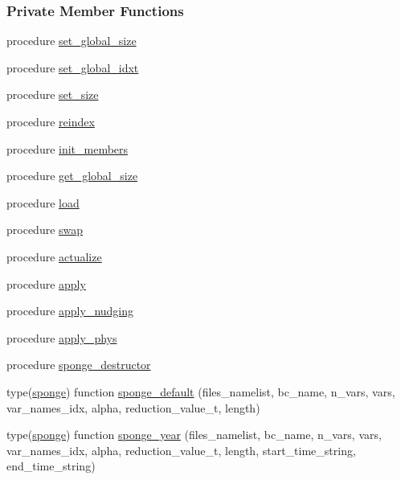 \subsubsection*{Private Member Functions}
\begin{DoxyCompactItemize}
\item 
procedure \mbox{\hyperlink{structsponge__mod_1_1sponge_afa5fb267b1d59f3b18ee94035a4816e3}{set\+\_\+global\+\_\+size}}
\item 
procedure \mbox{\hyperlink{structsponge__mod_1_1sponge_a2e1d0efffaf26aef18699231850069c5}{set\+\_\+global\+\_\+idxt}}
\item 
procedure \mbox{\hyperlink{structsponge__mod_1_1sponge_a2da2baff3ceb54811626114035885989}{set\+\_\+size}}
\item 
procedure \mbox{\hyperlink{structsponge__mod_1_1sponge_a8ea78d5f48aff24e7fd7ac5478e2bbc4}{reindex}}
\item 
procedure \mbox{\hyperlink{structsponge__mod_1_1sponge_a2b045a0f566da7df427aa0b776f92aa2}{init\+\_\+members}}
\item 
procedure \mbox{\hyperlink{structsponge__mod_1_1sponge_a6e25af9d9685756eca68b255dcbefde4}{get\+\_\+global\+\_\+size}}
\item 
procedure \mbox{\hyperlink{structsponge__mod_1_1sponge_a0383aabeecf15b7c47bc43c9b4746c60}{load}}
\item 
procedure \mbox{\hyperlink{structsponge__mod_1_1sponge_abe0102a0a72e189b8871724a21680c43}{swap}}
\item 
procedure \mbox{\hyperlink{structsponge__mod_1_1sponge_a7d01836ef5f2e2ea4ee11a6c6231baed}{actualize}}
\item 
procedure \mbox{\hyperlink{structsponge__mod_1_1sponge_aca76f3cc282e1918ec76c8d6c34d4315}{apply}}
\item 
procedure \mbox{\hyperlink{structsponge__mod_1_1sponge_a8617d126acfe553a2d478258adaf029f}{apply\+\_\+nudging}}
\item 
procedure \mbox{\hyperlink{structsponge__mod_1_1sponge_ab3f6fd55b37a4a4ba7fe9d0ac9f7b9ac}{apply\+\_\+phys}}
\item 
procedure \mbox{\hyperlink{structsponge__mod_1_1sponge_a592cfa3fa593c79ee6e25dfbe0b22025}{sponge\+\_\+destructor}}
\item 
type(\mbox{\hyperlink{structsponge__mod_1_1sponge}{sponge}}) function \mbox{\hyperlink{structsponge__mod_1_1sponge_afb942e8b46de1f0ea4de815db78a9c62}{sponge\+\_\+default}} (files\+\_\+namelist, bc\+\_\+name, n\+\_\+vars, vars, var\+\_\+names\+\_\+idx, alpha, reduction\+\_\+value\+\_\+t, length)
\item 
type(\mbox{\hyperlink{structsponge__mod_1_1sponge}{sponge}}) function \mbox{\hyperlink{structsponge__mod_1_1sponge_a9f7844c5d77b32ce566d362f29d4b816}{sponge\+\_\+year}} (files\+\_\+namelist, bc\+\_\+name, n\+\_\+vars, vars, var\+\_\+names\+\_\+idx, alpha, reduction\+\_\+value\+\_\+t, length, start\+\_\+time\+\_\+string, end\+\_\+time\+\_\+string)
\end{DoxyCompactItemize}
